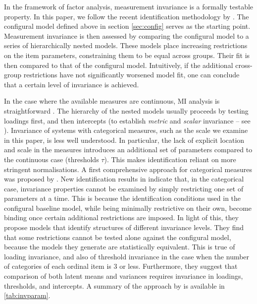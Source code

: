 In the framework of factor analysis, measurement invariance is a formally testable property. In this paper, we follow the recent identification methodology by \citet{Wu2016a}. The configural model defined above in section \ref{sec:config} serves as the starting point. Measurement invariance is then assessed by comparing the configural model to a series of hierarchically nested models. These models place increasing restrictions on the item parameters, constraining them to be equal across groups. Their fit is then compared to that of the configural model. Intuitively, if the additional cross-group restrictions have not significantly worsened model fit, one can conclude that a certain level of invariance is achieved. 

In the case where the available measures are continuous, MI analysis is straightforward \citep{vandeSchoot2012}. The hierarchy of the nested models usually proceeds by testing loadings first, and then intercepts (to establish \emph{metric} and \emph{scalar} invariance -- see \citealp{Vandenberg2000a}). Invariance of systems with categorical measures, such as the scale we examine in this paper, is less well understood. In particular, the lack of explicit location and scale in the measures introduces an additional set of parameters compared to the continuous case (thresholds $\tau$). This makes identification reliant on more stringent normalisations. A first comprehensive approach for categorical measures was proposed by \cite{Millsap2004}. New identification results in \cite{Wu2016a} indicate that, in the categorical case, invariance properties cannot be examined by simply restricting one set of parameters at a time. This is because the identification conditions used in the configural baseline model, while being minimally restrictive on their own, become binding once certain additional restrictions are imposed. In light of this, they propose models that identify structures of different invariance levels. They find that some restrictions cannot be tested alone against the configural model, because the models they generate are statistically equivalent. This is true of loading invariance, and also of threshold invariance in the case when the number of categories of each ordinal item is 3 or less. Furthermore, they suggest that comparison of both latent means and variances requires invariance in loadings, thresholds, and intercepts. A summary of the approach by \cite{Wu2016a} is available in \autoref{tab:invparam}.

